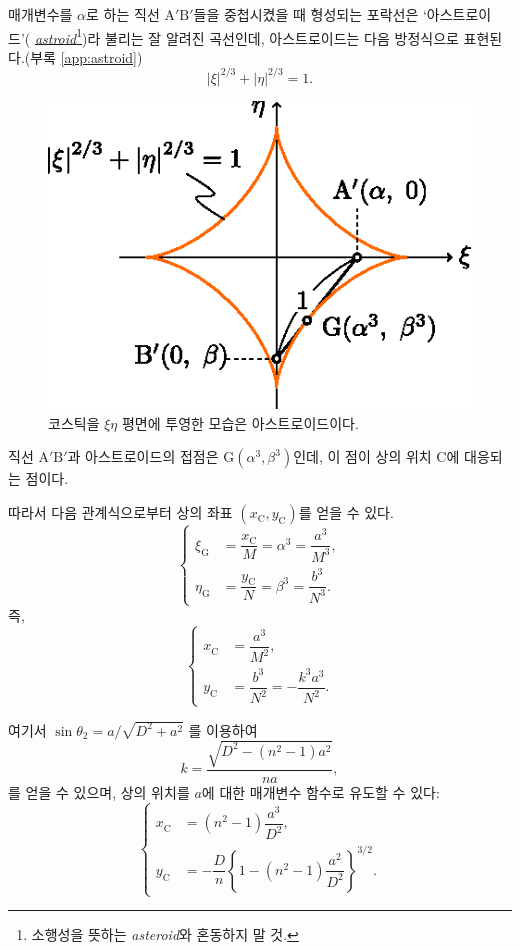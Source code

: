 \documentclass[twocolumn]{article}
\begin{document}
매개변수를 $\alpha$로 하는 직선 ${\mathrm{A'B'}}$들을 중첩시켰을 때 형성되는 포락선은 `아스트로이드'(%
\href{https://en.wikipedia.org/wiki/Astroid}{\emph{astroid}}\footnote{
소행성을 뜻하는 \emph{asteroid}와 혼동하지 말 것.})라 불리는 잘 알려진 곡선인데, 아스트로이드는 다음 방정식으로 표현된다.(부록 \ref{app:astroid})
$$ \left| \xi \right|^{2/3} + \left| \eta \right|^{2/3} = 1. $$

\begin{figure}
	\centering
	\includegraphics{figs/g107.eps}	
	\caption{코스틱을 $\xi\eta$ 평면에 투영한 모습은 아스트로이드이다.}
	\label{fig:astroid}
\end{figure}

직선 ${\mathrm{A'B'}}$과
아스트로이드의 접점은 $\mathrm{G}(\alpha^3, \beta^3)$인데, 이 점이 상의 위치 $\mathrm{C}$에 대응되는 점이다.
	
따라서 다음 관계식으로부터 상의 좌표 $(x_{\mathrm{C}}^{}, y_{\mathrm{C}}^{})$를 얻을 수 있다.
$$ \left\{ 
\begin{aligned}
	\xi_{\mathrm{G}}^{} &= \dfrac{x_{\mathrm{C}}^{}}{M} = \alpha^3 = \dfrac{a^3}{M^3},\\
	\eta_{\mathrm{G}}^{} &= \dfrac{y_{\mathrm{C}}^{}}{N} = \beta^3 = \dfrac{b^3}{N^3}.
\end{aligned}
\right.$$
즉,
$$ \left\{ 
\begin{aligned}
	x_{\mathrm{C}}^{} &= \dfrac{a^3}{M^2},\\
	y_{\mathrm{C}}^{} &= \dfrac{b^3}{N^2}=-\dfrac{k^3a^3}{N^2}.
\end{aligned}
\right.$$

여기서
$\sin\theta_2 = {a}/{\sqrt{D^2+a^2}}$
를 이용하여
$$k = \dfrac{\sqrt{D^2-(n^2-1)a^2}}{na},$$
를 얻을 수 있으며, 
상의 위치를 $a$에 대한 매개변수 함수로 유도할 수 있다:
$$ \left\{ 
\begin{aligned}
	x_{\mathrm{C}}^{} &= (n^2-1)\dfrac{a^3}{D^2},\\
	y_{\mathrm{C}}^{}
	&= -\dfrac{D}{n}\left\{ 1-(n^2-1)\dfrac{a^2}{D^2} \right\}^{3/2}.
\end{aligned}
\right.$$
\end{document}

